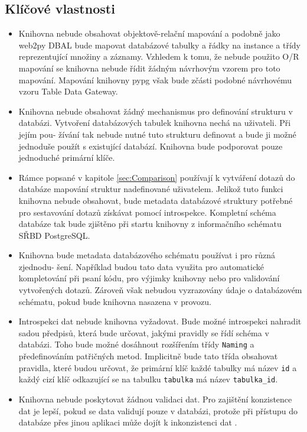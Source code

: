 \documentclass[ing,male,java,dept456]{diploma}						%
\begin{document}
\subsection{Klíčové vlastnosti}
\begin{itemize}
\item Knihovna nebude obsahovat objektově-relační mapování a podobně jako web2py DBAL bude mapovat databázové tabulky a řádky na instance a třídy reprezentující množiny a záznamy. Vzhledem k tomu, že nebude použito O/R mapování se knihovna nebude řídit žádným návrhovým vzorem pro toto mapování. Mapování knihovny pypg však bude zčásti podobné návrhovému vzoru Table Data Gateway. \\
\item Knihovna nebude obsahovat žádný mechanismus pro definování strukturu v databázi. Vytvoření databázových tabulek knihovna nechá na uživateli. Při jejím pou- žívání tak nebude nutné tuto strukturu definovat a bude ji možné jednoduše použít s existující databází. Knihovna bude podporovat pouze jednoduché primární klíče. \\
\item Rámce popsané v kapitole \ref{sec:Comparison} používají k vytváření dotazů do databáze mapování struktur nadefinované uživatelem. Jelikož tuto funkci knihovna nebude obsahovat, bude metadata databázové struktury potřebné pro sestavování dotazů získávat pomocí introspekce. Kompletní schéma databáze tak bude zjištěno při startu knihovny z informačního schématu SŘBD PostgreSQL. \\
\item Knihovna bude metadata databázového schématu používat i pro různá zjednodu- šení. Například budou tato data využita pro automatické kompletování při psaní kódu, pro výjimky knihovny nebo pro validování vytvořených dotazů. Zároveň však nebudou vyzrazovány údaje o databázovém schématu, pokud bude knihovna nasazena v provozu. \\
\item Introspekci dat nebude knihovna vyžadovat. Bude možné introspekci nahradit sadou předpisů, která bude určovat, jakými pravidly se řídí schéma v databázi. Toho bude možné dosáhnout rozšířením třídy \lstinline[style=inlinepython]|Naming| a předefinováním patřičných metod. Implicitně bude tato třída obsahovat pravidla, které budou určovat, že primární klíč každé tabulky má název \lstinline[style=inlinepython]|id| a každý cizí klíč odkazující se na tabulku \lstinline[style=inlinepython]|tabulka| má název \lstinline[style=inlinepython]|tabulka_id|. \\
\item Knihovna nebude poskytovat žádnou validaci dat. Pro zajištění konzistence dat je lepší, pokud se data validují pouze v databázi, protože při přístupu do databáze přes jinou aplikaci může dojít k inkonzistenci dat \cite{notorm-why}. \\
\end{itemize}
\end{document}
